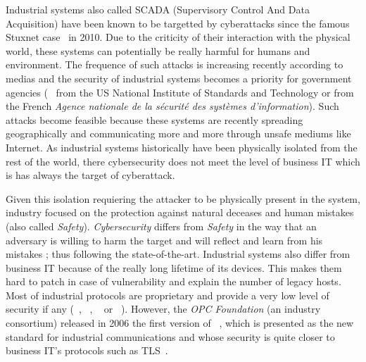 
Industrial systems also called SCADA (Supervisory Control And Data Acquisition)
have been known to be targetted by cyberattacks since the famous Stuxnet case~\cite{Lan11} in
2010.
Due to the criticity of their interaction with the physical world, these systems
can potentially be really harmful for humans and environment.
The frequence of such attacks is increasing recently according to medias and
the security of industrial systems becomes a priority for government agencies
(\eg~\cite{SFS11} from the US National Institute of Standards and Technology or
\cite{ANSSI12_guide_securite_industrielle_en} from the French {\em Agence
nationale de la sécurité des systèmes d'information}).
Such attacks become feasible because these systems are recently spreading
geographically and communicating more and more through unsafe mediums like
Internet.
As industrial systems historically have been physically isolated from the rest
of the world, there cybersecurity does not meet the level of business IT which
is has always the target of cyberattack.

Given this isolation requiering the attacker to be physically present in the
system, industry focused on the protection against natural deceases and human
mistakes (also called {\em Safety}).
{\em Cybersecurity} differs from {\em Safety} in the way that an adversary is
willing to harm the target and will reflect and learn from his mistakes ; thus
following the state-of-the-art.
Industrial systems also differ from business IT because of the really long
lifetime of its devices.
This makes them hard to patch in case of vulnerability and explain the number of
legacy hosts.
Most of industrial protocols are proprietary and provide a very low level of
security if any (\eg \modbus~\cite{MODBUS}, \profinet~\cite{PROFINET}, \etherip~\cite{Bro01} or
\dnp~\cite{CR04}).
However, the {\em OPC Foundation} (an industry consortium) released in 2006 the
first version of \opcua~\cite{MLD09}, which is presented as the new standard for
industrial communications and whose security is quite closer to business IT's
protocols such as TLS~\cite{DR08}.

